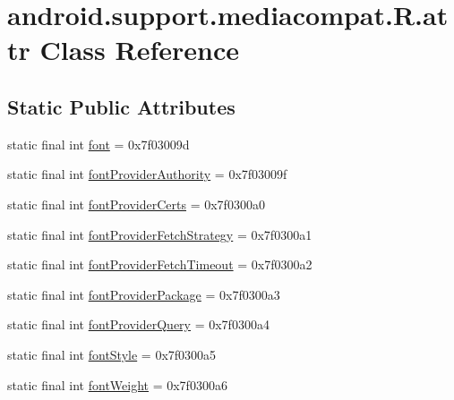 \hypertarget{classandroid_1_1support_1_1mediacompat_1_1_r_1_1attr}{}\section{android.\+support.\+mediacompat.\+R.\+attr Class Reference}
\label{classandroid_1_1support_1_1mediacompat_1_1_r_1_1attr}
\subsection*{Static Public Attributes}
\begin{DoxyCompactItemize}
\item 
static final int \mbox{\hyperlink{classandroid_1_1support_1_1mediacompat_1_1_r_1_1attr_ade19dd71a2fbc3dcb0f6095fec0e920c}{font}} = 0x7f03009d
\item 
static final int \mbox{\hyperlink{classandroid_1_1support_1_1mediacompat_1_1_r_1_1attr_a356001d5c6796ec75338d076da4a3211}{font\+Provider\+Authority}} = 0x7f03009f
\item 
static final int \mbox{\hyperlink{classandroid_1_1support_1_1mediacompat_1_1_r_1_1attr_ad586cf049fe9effed477b793ce2ce6a7}{font\+Provider\+Certs}} = 0x7f0300a0
\item 
static final int \mbox{\hyperlink{classandroid_1_1support_1_1mediacompat_1_1_r_1_1attr_a9b78e7794428aea6616b3ce978c68ea8}{font\+Provider\+Fetch\+Strategy}} = 0x7f0300a1
\item 
static final int \mbox{\hyperlink{classandroid_1_1support_1_1mediacompat_1_1_r_1_1attr_a6af382791cc57dc6799ca1be4027e2a7}{font\+Provider\+Fetch\+Timeout}} = 0x7f0300a2
\item 
static final int \mbox{\hyperlink{classandroid_1_1support_1_1mediacompat_1_1_r_1_1attr_ae9289e05813d9f2b3bf09e8954180d06}{font\+Provider\+Package}} = 0x7f0300a3
\item 
static final int \mbox{\hyperlink{classandroid_1_1support_1_1mediacompat_1_1_r_1_1attr_af36c254766862b797dd49eec49303645}{font\+Provider\+Query}} = 0x7f0300a4
\item 
static final int \mbox{\hyperlink{classandroid_1_1support_1_1mediacompat_1_1_r_1_1attr_ae0a3a36b1f13e9a01be878948552ffd1}{font\+Style}} = 0x7f0300a5
\item 
static final int \mbox{\hyperlink{classandroid_1_1support_1_1mediacompat_1_1_r_1_1attr_a9e377e9a8ae6b121f0bb76fffa0516c7}{font\+Weight}} = 0x7f0300a6
\end{DoxyCompactItemize}
